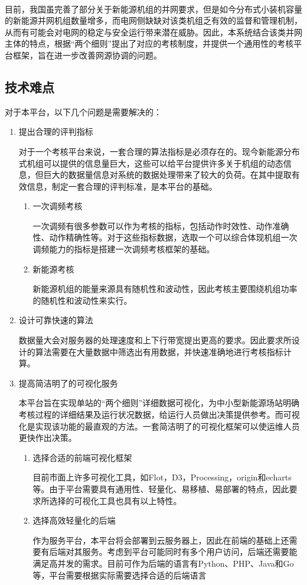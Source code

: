 \documentclass[winfonts,UTF8,a4paper]{ctexart}
\newcommand{\upcite}[1]{\textsuperscript{\textsuperscript{\cite{#1}}}}
\begin{document}
目前，我国虽完善了部分关于新能源机组的并网要求\upcite{电网运行准则}，但是如今分布式小装机容量的新能源并网机组数量增多，而电网侧缺缺对该类机组乏有效的监督和管理机制，从而有可能会对电网的稳定与安全运行带来潜在威胁。因此，本系统结合该类并网主体的特点，根据“两个细则”提出了对应的考核制度，并提供一个通用性的考核平台框架，旨在进一步改善网源协调的问题。

\subsection{技术难点}

对于本平台，以下几个问题是需要解决的：
\begin{enumerate}
	\item 提出合理的评判指标
	
	对于一个考核平台来说，一套合理的算法指标是必须存在的。现今新能源分布式机组可以提供的信息量巨大，这些可以给平台提供许多关于机组的动态信息，但巨大的数据量信息对系统的数据处理带来了较大的负荷。在其中提取有效信息，制定一套合理的评判标准，是本平台的基础。
	
		\begin{enumerate}
		\item 一次调频考核
		
		一次调频有很多参数可以作为考核的指标，包括动作时效性、动作准确性、动作精确性等。对于这些指标数据，选取一个可以综合体现机组一次调频能力的指标是搭建一次调频考核框架的基础。
		
		\item 新能源考核
		
		新能源机组的能量来源具有随机性和波动性，因此考核主要围绕机组功率的随机性和波动性来实行。
	\end{enumerate}
	\item 设计可靠快速的算法
	
	数据量大会对服务器的处理速度和上下行带宽提出更高的要求。因此要求所设计的算法需要在大量数据中筛选出有用数据，并快速准确地进行考核指标计算。

	
	\item 提高简洁明了的可视化服务
	
	本平台旨在实现单站的“两个细则”详细数据可视化，为中小型新能源场站明确考核过程的详细结果及运行状况数据，给运行人员做出决策提供参考。而可视化是实现该功能的最直观的方法。一套简洁明了的可视化框架可以使运维人员更快作出决策。
	
	\begin{enumerate}
		\item 选择合适的前端可视化框架
		
		目前市面上许多可视化工具，如Flot，D3，Processing，origin和echarts等。由于平台需要具有通用性、轻量化、易移植、易部署的特点，因此要求所选择的可视化工具也具有以上特性。
		\item 选择高效轻量化的后端
		
		作为服务平台，本平台将会部署到云服务器上，因此在前端的基础上还需要有后端对其服务。考虑到平台可能同时有多个用户访问，后端还需要能满足高并发的需求。目前可作为后端的语言有Python、PHP、Java和Go等，平台需要根据实际需要选择合适的后端语言
	\end{enumerate}
\end{enumerate}
\end{document}
